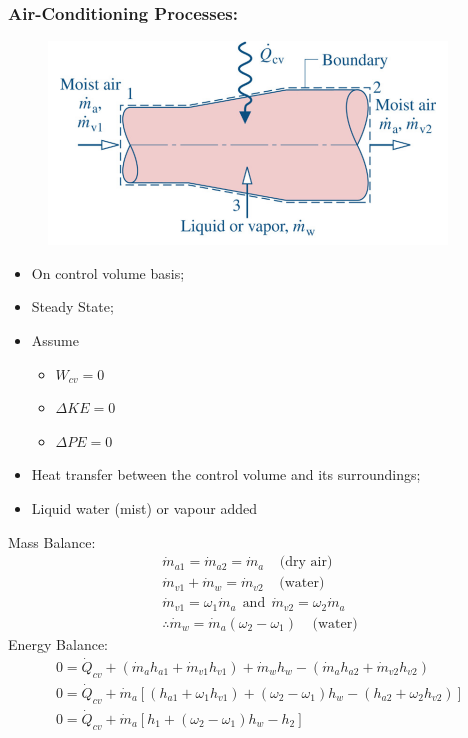 \documentclass[class=report, crop=false, 12pt,a4paper]{standalone}
\numberwithin{equation}{section}
\begin{document}
\subsubsection{Air-Conditioning Processes:}
\begin{figure}[H]
  \centering
  \includegraphics[width = 0.65 \textwidth]{../img/diagram110.png}
  \caption{}
\end{figure}
\begin{itemize}[noitemsep]
  \item On control volume basis;
  \item Steady State;
  \item Assume 
  \begin{itemize}[noitemsep]
    \item $W_{cv} = 0$
    \item $\Delta KE = 0$
    \item $\Delta PE = 0$
  \end{itemize}
  \item Heat transfer between the control volume and its surroundings;
  \item Liquid water (mist) or vapour added
\end{itemize}
Mass Balance:
\begin{gather}
  \dot{m}_{a1} = \dot{m}_{a2} = \dot{m}_{a} \ \ \ \ \ \text{(dry air)} \\[5pt]
  \dot{m}_{v1} + \dot{m}_{w} = \dot{m}_{v2} \ \ \ \ \ \text{(water)} \\[5pt]
  \dot{m}_{v1} = \omega_1\dot{m}_{a} \ \ \text{and} \ \ \dot{m}_{v2} = \omega_2\dot{m}_{a} \\[5pt]
  \therefore \dot{m}_{w} = \dot{m}_{a}(\omega_2 - \omega_1) \ \ \ \ \ \text{(water)}
\end{gather}
Energy Balance:
\begin{gather}
  0 = \dot{Q}_{cv} + (\dot{m}_{a}h_{a1} + \dot{m}_{v1}h_{v1}) + \dot{m}_{w}h_{w} - (\dot{m}_{a}h_{a2} + \dot{m}_{v2}h_{v2}) \\[5pt]
  0 = \dot{Q}_{cv} + \dot{m}_{a}\left[(h_{a1} + \omega_1h_{v1}) + (\omega_2-\omega_1)h_{w} - (h_{a2} + \omega_2h_{v2})\right] \\[5pt]
  0 = \dot{Q}_{cv} + \dot{m}_{a}[h_1 + (\omega_2-\omega_1)h_{w} - h_2]
\end{gather}
\end{document}
